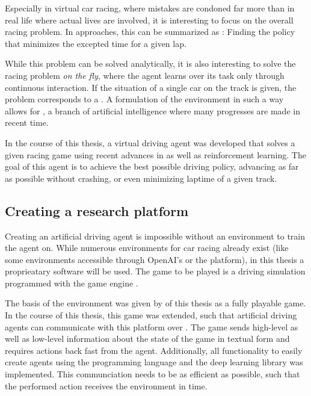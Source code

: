 Especially in virtual car racing, where mistakes are condoned far more than in real life where actual lives are involved, it is interesting to focus on the overall racing problem. In  approaches, this can be summarized as : Finding the policy that minimizes the excepted time for a given lap. 

While this problem can be solved analytically, it is also interesting to solve the racing problem \textit{on the fly}, where the agent learns over its task only through continuous interaction. If the situation of a single car on the track is given, the problem corresponds to a . A formulation of the environment in such a way allows for , a branch of artificial intelligence where many progresses are made in recent time.

In the course of this thesis, a virtual driving agent was developed that solves a given racing game using recent advances in  as well as reinforcement learning. The goal of this agent is to achieve the best possible driving policy, advancing as far as possible without crashing, or even minimizing laptime of a given track. 

\subsection{Creating a research platform}

Creating an artificial driving agent is impossible without an environment to train the agent on. While numerous environments for car racing already exist (like some environments accessible through OpenAI's  or the  platform), in this thesis a proprieatary software will be used. The game to be played is a driving simulation programmed with the game engine . 

The basis of the environment was given by \leon of this thesis as a fully playable game. In the course of this thesis, this game was extended, such that artificial driving agents can communicate with this platform over . The game sends high-level as well as low-level information about the state of the game in textual form and requires actions back fast from the agent. Additionally, all functionality to easily create agents using the programming language  and the deep learning library  was implemented. This communciation needs to be as efficient as possible, such that the performed action receives the environment in time.

